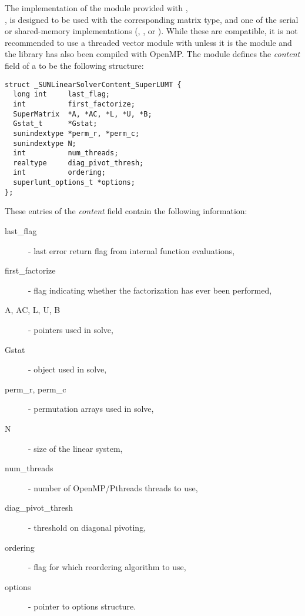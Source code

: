 
The {\superlumt} implementation of the {\sunlinsol} module provided with
{\sundials},\\
\noindent{\sunlinsolslumt}, is designed to be used with the
corresponding {\sunmatsparse} matrix type, and one of the serial or
shared-memory {\nvector} implementations ({\nvecs}, {\nvecopenmp}, or 
{\nvecpthreads}).  While these are compatible, it is not recommended
to use a threaded vector module with {\sunlinsolslumt} unless it is
the {\nvecopenmp} module and the {\superlumt} library has also been
compiled with OpenMP. The {\sunlinsolslumt} module defines the {\em
content} field of a  to be the following structure:
\begin{verbatim} 
struct _SUNLinearSolverContent_SuperLUMT {
  long int     last_flag;
  int          first_factorize;
  SuperMatrix  *A, *AC, *L, *U, *B;
  Gstat_t      *Gstat;
  sunindextype *perm_r, *perm_c;
  sunindextype N;
  int          num_threads;
  realtype     diag_pivot_thresh; 
  int          ordering;
  superlumt_options_t *options;
};
\end{verbatim}
These entries of the \emph{content} field contain the following
information:
\begin{description}
  \item[last\_flag] - last error return flag from internal function evaluations,
  \item[first\_factorize] - flag indicating whether the factorization
    has ever been performed, 
  \item[A, AC, L, U, B] -  pointers used in solve,
  \item[Gstat] -  object used in solve,
  \item[perm\_r, perm\_c] - permutation arrays used in solve,
  \item[N] - size of the linear system,
  \item[num\_threads] - number of OpenMP/Pthreads threads to use,
  \item[diag\_pivot\_thresh] - threshold on diagonal pivoting,
  \item[ordering] - flag for which reordering algorithm to use,
  \item[options] - pointer to {\superlumt} options structure.
\end{description}

